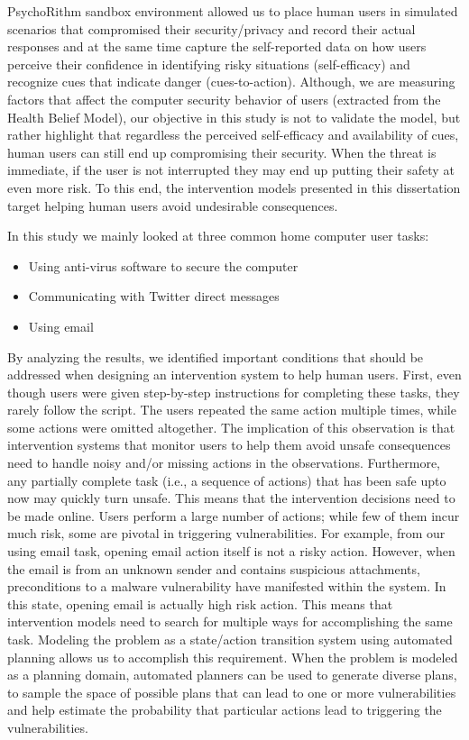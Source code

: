 PsychoRithm sandbox environment allowed us to place human users in simulated scenarios that compromised their security/privacy and record their actual responses and at the same time capture the self-reported data on how users perceive their confidence in identifying risky situations (self-efficacy) and recognize cues that indicate danger (cues-to-action). Although, we are measuring factors that affect the computer security behavior of users (extracted from the Health Belief Model), our objective in this study is not to validate the model, but rather highlight that regardless the perceived self-efficacy and availability of cues, human users can still end up compromising their security. 
When the threat is immediate, if the user is not interrupted they may end up putting their safety at even more risk. 
To this end, the intervention models presented in this dissertation target helping human users avoid undesirable consequences.

In this study we mainly looked at three common home computer user tasks:
\begin{itemize}
\item Using anti-virus software to secure the computer
\item Communicating with Twitter direct messages
\item Using email
\end{itemize}

By analyzing the results, we identified important conditions that should be addressed when designing an intervention system to help human users. First, even though users were given step-by-step instructions for completing these tasks, they rarely follow the script. 
The users repeated the same action multiple times, while some actions were omitted altogether. 
The implication of this observation is that intervention systems that monitor users to help them avoid unsafe consequences need to handle noisy and/or missing actions in the observations.
Furthermore, any partially complete task (i.e., a sequence of actions) that has been safe upto now may quickly turn unsafe. 
This means that the intervention decisions need to be made online. 
Users perform a large number of actions; while few of them incur much risk, some are pivotal in triggering vulnerabilities. For example, from our using email task, opening email action itself is not a risky action. 
However, when the email is from an unknown sender and contains suspicious attachments, preconditions to a malware vulnerability have manifested within the system. In this state,  opening email is actually high risk action.
This means that intervention models need to search for multiple ways for accomplishing the same task. Modeling the problem as a state/action transition system using automated planning allows us to accomplish this requirement. When the problem is modeled as a planning domain, automated planners can be used to generate diverse plans, to sample the space of possible plans that can lead to one or more vulnerabilities and help
estimate the probability that particular actions lead to triggering the vulnerabilities.


